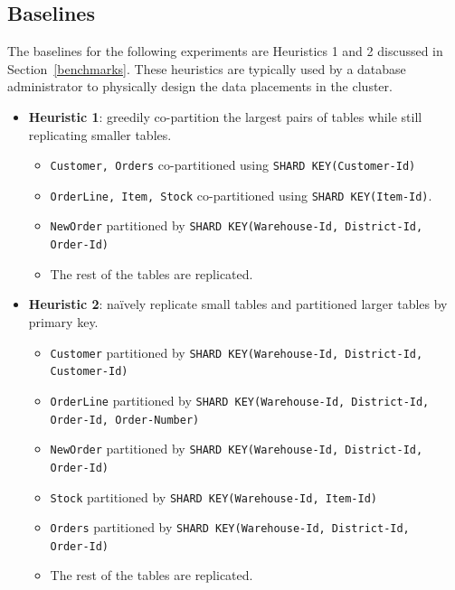 \subsection{Baselines}
\label{sec:baseline}
The baselines for the following experiments are Heuristics 1 and 2 discussed in Section~\ref{benchmarks}. These heuristics are typically used by a database administrator to physically design the data placements in the cluster.
\begin{itemize}
    \item \textbf{Heuristic 1}: greedily co-partition the largest pairs of tables while still replicating smaller tables.
    \begin{itemize}
        \item \texttt{Customer, Orders} co-partitioned using \texttt{SHARD KEY(Customer-Id)}
        \item \texttt{OrderLine, Item, Stock} co-partitioned using \texttt{SHARD KEY(Item-Id)}.
        \item \texttt{NewOrder} partitioned by \texttt{SHARD KEY(Warehouse-Id, District-Id, \\Order-Id)}        
        \item The rest of the tables are replicated.
    \end{itemize}
    \item \textbf{Heuristic 2}: naïvely replicate small tables and partitioned larger tables by primary key.
    \begin{itemize}
        \item \texttt{Customer} partitioned by \texttt{SHARD KEY(Warehouse-Id, District-Id, \\Customer-Id)}
        \item \texttt{OrderLine} partitioned by \texttt{SHARD KEY(Warehouse-Id, District-Id, \\Order-Id, Order-Number)}
        \item \texttt{NewOrder} partitioned by \texttt{SHARD KEY(Warehouse-Id, District-Id, \\Order-Id)}
        \item \texttt{Stock} partitioned by \texttt{SHARD KEY(Warehouse-Id, Item-Id)}
        \item \texttt{Orders} partitioned by \texttt{SHARD KEY(Warehouse-Id, District-Id, \\Order-Id)}
        \item The rest of the tables are replicated.
    \end{itemize}
\end{itemize}

